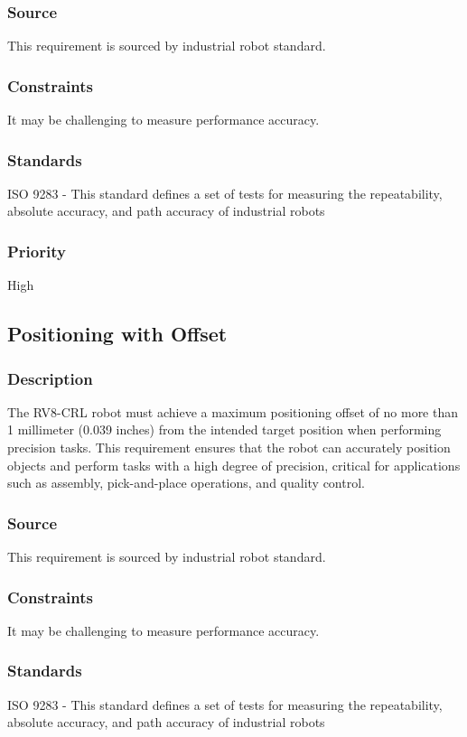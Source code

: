 \subsubsection{Source}
This requirement is sourced by industrial robot standard.
\subsubsection{Constraints}
It may be challenging to measure performance accuracy.
\subsubsection{Standards}
ISO 9283 - This standard defines a set of tests for measuring the repeatability, absolute accuracy, and path accuracy of industrial robots
\subsubsection{Priority}
High

\subsection{Positioning with Offset}
\subsubsection{Description}
The RV8-CRL robot must achieve a maximum positioning offset of no more than 1 millimeter (0.039 inches) from the intended target position when performing precision tasks. This requirement ensures that the robot can accurately position objects and perform tasks with a high degree of precision, critical for applications such as assembly, pick-and-place operations, and quality control.
\subsubsection{Source}
This requirement is sourced by industrial robot standard.
\subsubsection{Constraints}
It may be challenging to measure performance accuracy.
\subsubsection{Standards}
ISO 9283 - This standard defines a set of tests for measuring the repeatability, absolute accuracy, and path accuracy of industrial robots
